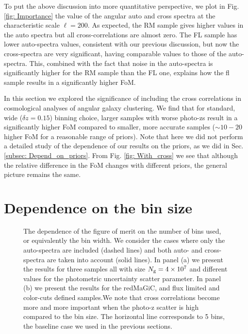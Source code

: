 \documentclass[a4paper,fleqn,usenatbib]{mnras}
\begin{document}
To put the above discussion into  more quantitative perspective, we plot in Fig. \ref{fig: Importance} the value of the angular auto and cross spectra at the characteristic scale $\ell = 200$. As expected, the RM sample gives higher values in the auto spectra but all cross-correlations are almost zero. The FL sample has lower auto-spectra values, consistent with our previous discussion,  but now the cross-spectra are very significant, having comparable values to those of the auto-spectra. This, combined  with the fact that noise in the auto-spectra is significantly higher for the RM sample than the FL one, explains how the fl sample results in a significantly higher FoM.

In this section we explored the significance of including the cross correlations in cosmological analyses of angular galaxy clustering. We find that for standard, wide ($\delta z = 0.15$) binning choice, larger samples with worse photo-zs result in a significantly higher FoM compared to smaller, more accurate samples ($\sim 10-20$  higher FoM for a reasonable range of priors). Note that here we did not perform a detailed study of the dependence of our results on the priors, as we did in Sec. \ref{subsec: Depend_on_priors}. From Fig. \ref{fig: With_cross} we see that although the relative difference in the FoM changes with different priors, the general picture remains the same. 


\section{Dependence on the bin size}
\label{sec: Bin_size}



\begin{figure*}
\centering
{}
\caption{The dependence of the figure of merit on the number of bins used, or equivalently the bin width. We consider  the cases where only the auto-spectra are included (dashed lines) and both auto- and cross-spectra are taken into account (solid lines). In panel (a) we present the results for three samples all with size $N_{\mbox{\scriptsize{g}}} = 4 \times 10^7$ and different values for the photometric uncertainty scatter parameter. In panel (b) we present the results for the redMaGiC, and flux limited  and color-cuts defined samples.We note  that cross correlations become more and more important when the photo-z scatter is high compared to the bin size. The horizontal line corresponds to 5 bins, the baseline case we used in the previous sections.  }
\label{fig: Number_of_bins}
\end{figure*}
\end{document}
